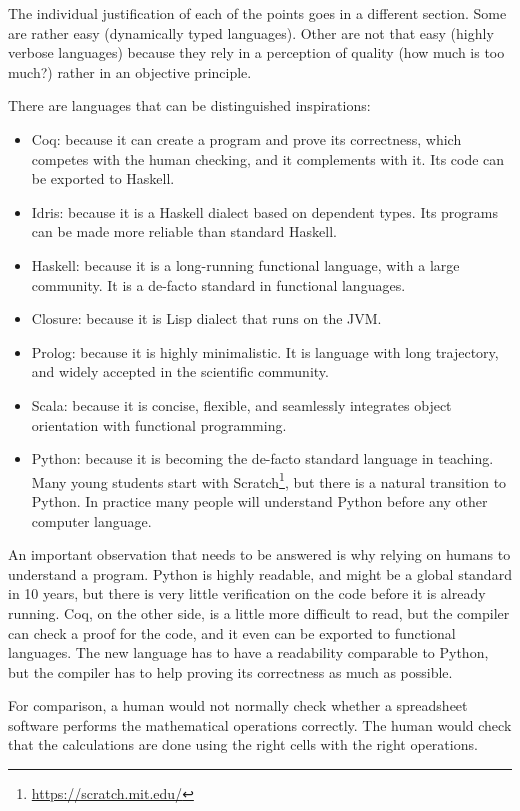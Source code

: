 {    The individual justification of each of the points goes in a different section.
    Some are rather easy (dynamically typed languages). Other are not that easy (highly verbose languages) because they rely in a perception of quality (how much is too much?) rather in an objective principle.

    There are languages that can be distinguished inspirations:
    \begin{itemize}
        \item Coq: because it can create a program and prove its correctness, which competes with the human checking, and it complements with it.
        Its code can be exported to Haskell.
        \item Idris: because it is a Haskell dialect based on dependent types.
        Its programs can be made more reliable than standard Haskell.
        \item Haskell: because it is a long-running functional language, with a large community.
        It is a de-facto standard in functional languages.
        \item Closure: because it is Lisp dialect that runs on the JVM.
        \item Prolog: because it is highly minimalistic.
        It is language with long trajectory, and widely accepted in the scientific community.
        \item Scala: because it is concise, flexible, and seamlessly integrates object orientation with functional programming.
        \item Python: because it is becoming the de-facto standard language in teaching.
        Many young students start with Scratch\footnote{\url{https://scratch.mit.edu/}}, but there is a natural transition to Python. In practice many people will understand Python before any other computer language.
    \end{itemize}

    An important observation that needs to be answered is why relying on humans to understand a program.
    Python is highly readable, and might be a global standard in 10 years, but there is very little verification on the code before it is already running.
    Coq, on the other side, is a little more difficult to read, but the compiler can check a proof for the code, and it even can be exported to functional languages.
    The new language has to have a readability comparable to Python, but the compiler has to help proving its correctness as much as possible.

    For comparison, a human would not normally check whether a spreadsheet software performs the mathematical operations correctly.
    The human would check that the calculations are done using the right cells with the right operations.
}

